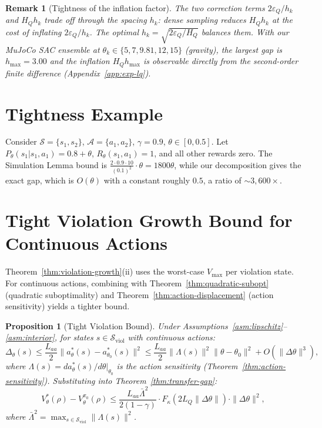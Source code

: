 \documentclass{article}
\newtheorem{proposition}{Proposition}
\newtheorem{remark}{Remark}
\newcommand{\cS}{\mathcal{S}}
\newcommand{\cA}{\mathcal{A}}
\newcommand{\Sviol}{\mathcal{S}_{\mathrm{viol}}}
\newcommand{\Vmax}{V_{\max}}
\begin{document}
\begin{remark}[Tightness of the inflation factor]
\label{rem:lq-inflation}
The two correction terms $2\varepsilon_Q/h_k$ and $H_Q h_k$ trade off through the spacing $h_k$: dense sampling reduces $H_Q h_k$ at the cost of inflating $2\varepsilon_Q/h_k$. The optimal $h_k = \sqrt{2\varepsilon_Q / H_Q}$ balances them. With our MuJoCo SAC ensemble at $\theta_k \in \{5, 7, 9.81, 12, 15\}$ (gravity), the largest gap is $h_{\max} = 3.00$ and the inflation $H_Q h_{\max}$ is observable directly from the second-order finite difference (Appendix~\ref{app:exp-lq}).
\end{remark}

\section{Tightness Example}
\label{app:tightness}

Consider $\cS = \{s_1, s_2\}$, $\cA = \{a_1, a_2\}$, $\gamma = 0.9$, $\theta \in [0, 0.5]$. Let $P_\theta(s_1|s_1,a_1) = 0.8+\theta$, $R_\theta(s_1,a_1) = 1$, and all other rewards zero. The Simulation Lemma bound is $\frac{2\cdot0.9\cdot10}{(0.1)^2}\cdot\theta = 1800\theta$, while our decomposition gives the exact gap, which is $O(\theta)$ with a constant roughly $0.5$, a ratio of $\sim 3{,}600\times$.

\section{Tight Violation Growth Bound for Continuous Actions}
\label{app:tight-violation}

Theorem~\ref{thm:violation-growth}(ii) uses the worst-case $\Vmax$ per violation state. For continuous actions, combining with Theorem~\ref{thm:quadratic-subopt} (quadratic suboptimality) and Theorem~\ref{thm:action-displacement} (action sensitivity) yields a tighter bound.

\begin{proposition}[Tight Violation Bound]
\label{prop:tight-violation}
Under Assumptions~\ref{asm:lipschitz}--\ref{asm:interior}, for states $s \in \Sviol$ with continuous actions:
\begin{equation}
\Delta_{\theta}(s) \leq \frac{L_{aa}}{2}\|a^*_{\theta}(s) - a^*_{\theta_0}(s)\|^2 \leq \frac{L_{aa}}{2}\|\Lambda(s)\|^2\|\theta - \theta_0\|^2 + O(\|\Delta\theta\|^3),
\end{equation}
where $\Lambda(s) = da^*_\theta(s)/d\theta|_{\theta_0}$ is the action sensitivity (Theorem~\ref{thm:action-sensitivity}). Substituting into Theorem~\ref{thm:transfer-gap}:
\begin{equation}
V^*_\theta(\rho) - V^{\pi_0}_\theta(\rho) \leq \frac{L_{aa}\bar{\Lambda}^2}{2(1-\gamma)} \cdot F_\kappa(2L_Q\|\Delta\theta\|) \cdot \|\Delta\theta\|^2,
\end{equation}
where $\bar{\Lambda}^2 = \max_{s \in \Sviol}\|\Lambda(s)\|^2$.
\end{proposition}
\end{document}
